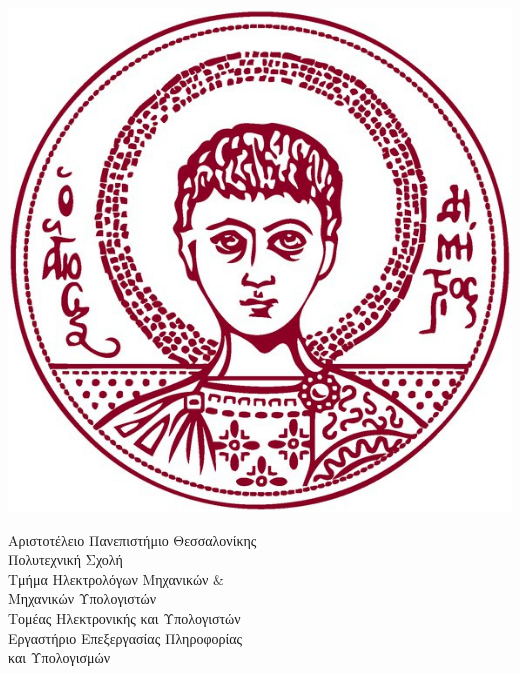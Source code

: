 \begin{titlepage}

  \begin{minipage}{0.3\textwidth}
    \begin{flushleft}
      \includegraphics[scale=0.25]{./images/title/authLogoTr.jpg}
    \end{flushleft}
  \end{minipage}
  \begin{minipage}{0.9\textwidth}
    \begin{flushleft}
      \large Αριστοτέλειο Πανεπιστήμιο Θεσσαλονίκης \\
      Πολυτεχνική Σχολή \\
      Τμήμα Ηλεκτρολόγων Μηχανικών $\&$ \\ Μηχανικών Υπολογιστών\\
      \vspace{1mm}
      \normalsize{Τομέας Ηλεκτρονικής και Υπολογιστών} \\
      \vspace{1mm}
      \normalsize{Εργαστήριο Επεξεργασίας Πληροφορίας \\ και Υπολογισμών} \\[5cm] 
    \end{flushleft}
  \end{minipage} \\[1.7cm]





\end{titlepage}
